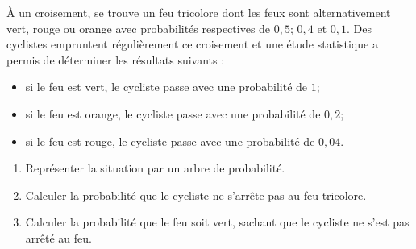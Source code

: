 \documentclass[11pt]{article}
\begin{document}
\begin{exo}[$4$ points]
  À un croisement, se trouve un feu tricolore dont les feux sont alternativement
  vert, rouge ou orange avec probabilités respectives de $0,5$; $0,4$ et $0,1$.
  Des cyclistes empruntent régulièrement ce croisement et une étude statistique
  a permis de déterminer les résultats suivants :
  \begin{itemize}
    \item si le feu est vert, le cycliste passe avec une probabilité de $1$;
    \item si le feu est orange, le cycliste passe avec une probabilité de $0,2$;
    \item si le feu est rouge, le cycliste passe avec une probabilité de $0,04$.
  \end{itemize}
  \begin{enumerate}
    \item Représenter la situation par un arbre de probabilité.
    \item Calculer la probabilité que le cycliste ne s'arrête pas au feu
      tricolore.
    \item Calculer la probabilité que le feu soit vert, sachant que le cycliste
      ne s'est pas arrêté au feu.
  \end{enumerate}
\end{exo}
\end{document}
